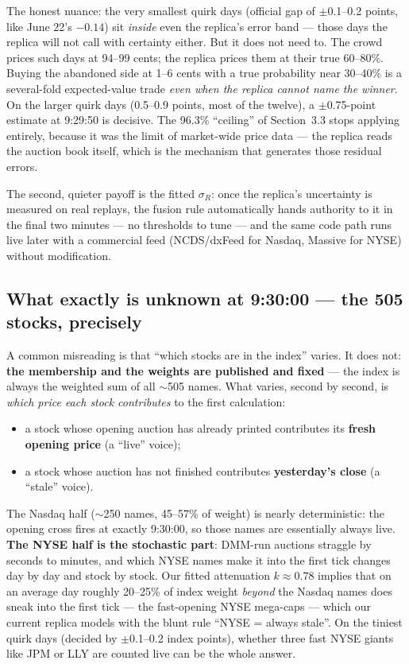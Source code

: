 \documentclass[11pt,a4paper]{article}
\begin{document}
The honest nuance: the very smallest quirk days (official gap of
$\pm$0.1--0.2 points, like June 22's $-0.14$) sit \emph{inside} even the
replica's error band --- those days the replica will not call with certainty
either. But it does not need to. The crowd prices such days at 94--99 cents;
the replica prices them at their true 60--80\%. Buying the abandoned side at
1--6 cents with a true probability near 30--40\% is a several-fold
expected-value trade \emph{even when the replica cannot name the winner}. On
the larger quirk days (0.5--0.9 points, most of the twelve), a $\pm$0.75-point
estimate at 9:29:50 is decisive. The 96.3\% ``ceiling'' of
Section~3.3 stops applying entirely, because it was the limit of
market-wide price data --- the replica reads the auction book itself, which is
the mechanism that generates those residual errors.

The second, quieter payoff is the fitted $\sigma_R$: once the replica's
uncertainty is measured on real replays, the fusion rule automatically hands
authority to it in the final two minutes --- no thresholds to tune --- and the
same code path runs live later with a commercial feed (NCDS/dxFeed for Nasdaq,
Massive for NYSE) without modification.

\subsection{What exactly is unknown at 9:30:00 --- the 505 stocks, precisely}

A common misreading is that ``which stocks are in the index'' varies. It does
not: \textbf{the membership and the weights are published and fixed} --- the
index is always the weighted sum of all $\sim$505 names. What varies, second
by second, is \emph{which price each stock contributes} to the first
calculation:

\begin{itemize}
\item a stock whose opening auction has already printed contributes its
\textbf{fresh opening price} (a ``live'' voice);
\item a stock whose auction has not finished contributes
\textbf{yesterday's close} (a ``stale'' voice).
\end{itemize}

The Nasdaq half ($\sim$250 names, 45--57\% of weight) is nearly
deterministic: the opening cross fires at exactly 9:30:00, so those names are
essentially always live. \textbf{The NYSE half is the stochastic part}:
DMM-run auctions straggle by seconds to minutes, and which NYSE names make it
into the first tick changes day by day and stock by stock. Our fitted
attenuation $k\approx0.78$ implies that on an average day roughly 20--25\% of
index weight \emph{beyond} the Nasdaq names does sneak into the first tick
--- the fast-opening NYSE mega-caps --- which our current replica models with
the blunt rule ``NYSE = always stale''. On the tiniest quirk days (decided by
$\pm$0.1--0.2 index points), whether three fast NYSE giants like JPM or LLY
are counted live can be the whole answer.
\end{document}
